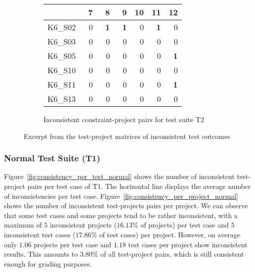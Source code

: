 \begin{figure}[htpb]
\begin{subfigure}{.4\textwidth}
        \setlength{\tabcolsep}{0.2em}
        \tiny
        \begin{tabular}{l|rrrrrr}
            \toprule
                    & \ 7        & \ 8        & \ 9        & 10         & 11         & 12         \\
            \midrule
            K6\_S02 & 0          & \textbf{1} & \textbf{1} & 0          & \textbf{1} & 0          \\
            K6\_S03 & 0          & 0          & 0          & 0          & 0          & 0          \\
            K6\_S05 & 0          & 0          & 0          & 0          & 0          & \textbf{1} \\
            K6\_S10 & 0          & 0          & 0          & 0          & 0          & 0          \\
            K6\_S11 & 0          & 0          & 0          & 0          & 0          & \textbf{1} \\
            K6\_S13 & 0          & 0          & 0          & 0          & 0          & 0          \\
            \bottomrule
        \end{tabular}
        \caption{Inconsistent constraint-project pairs for test suite T2}
        \label{tab:inconsistencies_matrix_excerpt_constraint}
        \setlength{\tabcolsep}{\defaulttabcolsep}
    \end{subfigure}

    \vspace{-3\bigskipamount}
    \caption{Excerpt from the test-project matrices of inconsistent test outcomes}
    \label{tab:inconsistencies_matrices_excerpt}
\end{figure}

\subsubsection{Normal Test Suite (T1)}

\noindent Figure~\ref{fig:consistency_per_test_normal} shows the number of inconsistent test-project pairs per test case of T1.
The horizontal line displays the average number of inconsistencies per test case.
Figure~\ref{fig:consistency_per_project_normal} shows the number of inconsistent test-projects pairs per project.
We can observe that some test cases and some projects tend to be rather inconsistent,
with a maximum of $5$ inconsistent projects ($16.13\%$ of projects) per test case and $5$ inconsistent test cases ($17.86\%$ of test cases) per project.
However, on average only $1.06$ projects per test case and $1.18$ test cases per project show inconsistent results.
This amounts to $3.80\%$ of all test-project pairs, which is still consistent enough for grading purposes.
\parspace

